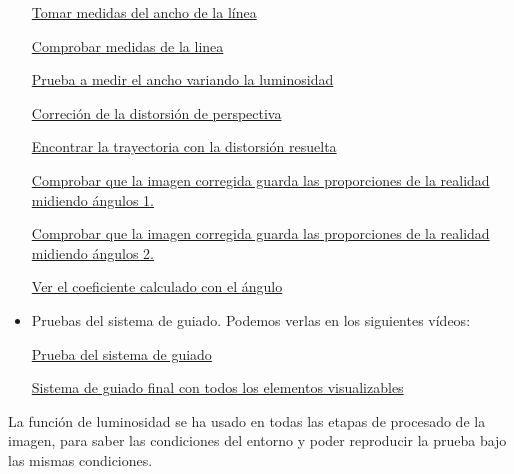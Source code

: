 \begin{itemize}
	\href{https://youtu.be/rUQrHbA_H8A}{Tomar medidas del ancho de la línea}
	
	\href{https://youtu.be/ClA-Ei8f18o}{Comprobar medidas de la linea}
	
	\href{https://youtu.be/m7t4dcfuFeo}{Prueba a medir el ancho variando la luminosidad}
	
	\href{https://youtu.be/Y9QgFIMXSiU}{Correción de la distorsión de perspectiva}
	
	\href{https://youtu.be/Ae5aTr3mg6k}{Encontrar la trayectoria con la distorsión resuelta}
	
	\href{https://youtu.be/wc00piNmfyI}{Comprobar que la imagen corregida guarda las proporciones de la realidad midiendo ángulos 1.}
	
	\href{https://youtu.be/T0djIwql6G8}{Comprobar que la imagen corregida guarda las proporciones de la realidad midiendo ángulos 2.}
	
	\href{https://youtu.be/pRE8zerfp7E}{Ver el coeficiente calculado con el ángulo}
	
	\item Pruebas del sistema de guiado. Podemos verlas en los siguientes vídeos:
	
	\href{https://youtu.be/ODr3q91MLk0}{Prueba del sistema de guiado}
	
	\href{https://youtu.be/8j69cDydXfA}{Sistema de guiado final con todos los elementos visualizables}
\end{itemize}

La función de luminosidad se ha usado en todas las etapas de procesado de la imagen, para saber las condiciones del entorno y poder reproducir la prueba bajo las mismas condiciones.
